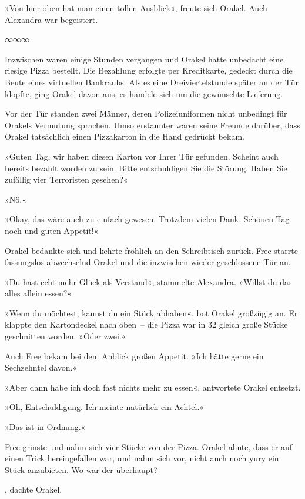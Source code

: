 »Von hier oben hat man einen tollen Ausblick«, freute sich Orakel. Auch Alexandra war begeistert.

\begin{center}
∞∞∞
\end{center}

Inzwischen waren einige Stunden vergangen und Orakel hatte unbedacht eine riesige Pizza bestellt. Die Bezahlung erfolgte per Kreditkarte, gedeckt durch die Beute eines virtuellen Bankraubs. Als es eine Dreiviertelstunde später an der Tür klopfte, ging Orakel davon aus, es handele sich um die gewünschte Lieferung.

Vor der Tür standen zwei Männer, deren Polizeiuniformen nicht unbedingt für Orakels Vermutung sprachen. Umso erstaunter waren seine Freunde darüber, dass Orakel tatsächlich einen Pizzakarton in die Hand gedrückt bekam.

»Guten Tag, wir haben diesen Karton vor Ihrer Tür gefunden. Scheint auch bereits bezahlt worden zu sein. Bitte entschuldigen Sie die Störung. Haben Sie zufällig vier Terroristen gesehen?«

»Nö.«

»Okay, das wäre auch zu einfach gewesen. Trotzdem vielen Dank. Schönen Tag noch und guten Appetit!«

Orakel bedankte sich und kehrte fröhlich an den Schreibtisch zurück. Free starrte fassungslos abwechselnd Orakel und die inzwischen wieder geschlossene Tür an.

»Du hast echt mehr Glück als Verstand«, stammelte Alexandra. »Willst du das alles allein essen?«

»Wenn du möchtest, kannst du ein Stück abhaben«, bot Orakel großzügig an. Er klappte den Kartondeckel nach oben~– die Pizza war in 32 gleich große Stücke geschnitten worden. »Oder zwei.«

Auch Free bekam bei dem Anblick großen Appetit. »Ich hätte gerne ein Sechzehntel davon.«

»Aber dann habe ich doch fast nichts mehr zu essen«, antwortete Orakel entsetzt.

»Oh, Entschuldigung. Ich meinte natürlich ein Achtel.«

»Das ist in Ordnung.«

Free grinste und nahm sich vier Stücke von der Pizza. Orakel ahnte, dass er auf einen Trick hereingefallen war, und nahm sich vor, nicht auch noch yury ein Stück anzubieten. Wo war der überhaupt?

, dachte Orakel. 

